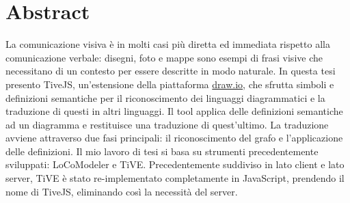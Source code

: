 \chapter*{Abstract}

    La comunicazione visiva è in molti casi più diretta ed immediata rispetto alla comunicazione verbale: disegni, foto e mappe sono esempi di frasi visive che necessitano di un contesto per essere descritte in modo naturale.
    \newline
    In questa tesi presento TiveJS, un'estensione della piattaforma \href{https://www.draw.io/}{draw.io}, che sfrutta  simboli e  definizioni semantiche per il riconoscimento dei linguaggi diagrammatici e la traduzione di questi in altri linguaggi.
    Il tool applica  delle definizioni semantiche  ad un diagramma e restituisce una traduzione di quest'ultimo. La traduzione avviene attraverso due fasi principali: il riconoscimento del grafo e l'applicazione delle definizioni.
    \newline
    Il mio lavoro di tesi si basa su strumenti precedentemente sviluppati: LoCoModeler e TiVE. Precedentemente suddiviso in lato client e lato server, TiVE è stato re-implementato completamente in JavaScript, prendendo il nome di TiveJS, eliminando così la necessità del server.